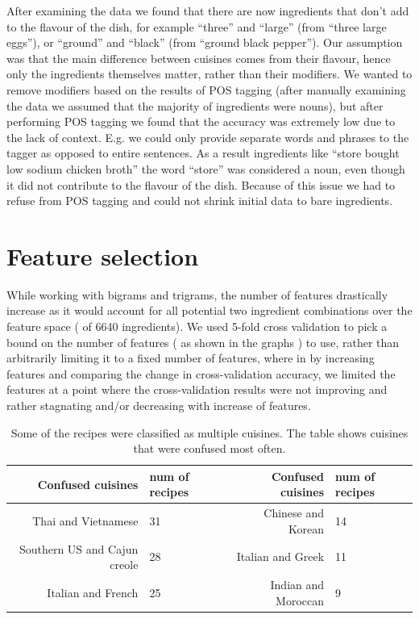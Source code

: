 \documentclass[prodmode,acmtap]{acmlarge}
\begin{document}
After examining the data we found that there are now ingredients that don’t add to the flavour of the dish, for example ``three'' and ``large'' (from ``three large eggs''), or ``ground'' and ``black'' (from ``ground black pepper''). Our assumption was that the main difference between cuisines comes from their flavour, hence only the ingredients themselves matter, rather than their modifiers. We wanted to remove modifiers based on the results of POS tagging (after manually examining the data we assumed that the majority of ingredients were nouns), but after performing POS tagging we found that the accuracy was extremely low due to the lack of context. E.g. we could only provide separate words and phrases to the tagger as opposed to entire sentences. As a result ingredients like ``store bought low sodium chicken broth'' the word ``store'' was considered a noun, even though it did not contribute to the flavour of the dish. Because of this issue we had to refuse from POS tagging and could not shrink initial data to bare ingredients. 



\section{Feature selection}
While working with bigrams and trigrams, the number of features drastically increase as it would account for all potential two ingredient combinations over the feature space ( of 6640 ingredients). 
We used 5-fold cross validation to pick a bound on the number of features ( as shown in the graphs ) to use, rather than arbitrarily limiting it to a fixed number of features, where in by increasing features and comparing the change in cross-validation accuracy, we limited the features at a point where the cross-validation results were not improving and rather stagnating and/or decreasing with increase of features.

\begin {table}
\centering
\begin{tabular}{|r|l||r|l|}
  \hline
  Confused cuisines & num of recipes & Confused cuisines & num of recipes \\
  \hline
  Thai and Vietnamese & 31 & Chinese and Korean & 14\\
  Southern US and Cajun creole & 28 & Italian and Greek & 11\\
  Italian and French & 25 & Indian and Moroccan & 9 \\
  \hline
\end{tabular}
\caption{Some of the recipes were classified as multiple cuisines. The table shows cuisines that were confused most often.}
\label{confusiontable}
\end {table}
\end{document}
